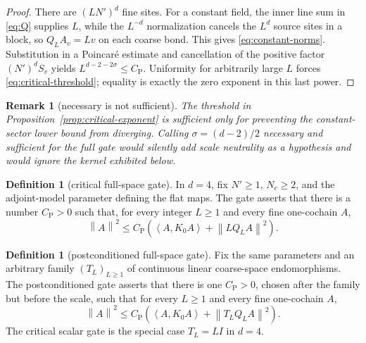 \documentclass[11pt]{article}
\newtheorem{remark}[theorem]{Remark}
\theoremstyle{definition}
\newtheorem{definition}[theorem]{Definition}
\newcommand{\CP}{C_{\mathrm P}}
\newcommand{\ip}[2]{\left\langle #1,#2\right\rangle}
\newcommand{\norm}[1]{\left\lVert #1\right\rVert}
\begin{document}
\begin{proof}
There are $(LN')^d$ fine sites.  For a constant field, the inner line sum in
\eqref{eq:Q} supplies $L$, while the $L^{-d}$ normalization cancels the $L^d$
source sites in a block, so $Q_LA_v=L v$ on each coarse bond.  This gives
\eqref{eq:constant-norms}.  Substitution in a Poincar\'e estimate and
cancellation of the positive factor $(N')^dS_v$ yields
$L^{d-2-2\sigma}\le\CP$.  Uniformity for arbitrarily large $L$ forces
\eqref{eq:critical-threshold}; equality is exactly the zero exponent in this
last power.
\end{proof}

\begin{remark}[necessary is not sufficient]\label{rem:not-sufficient}
The threshold in Proposition~\ref{prop:critical-exponent} is sufficient only
for preventing the \emph{constant-sector} lower bound from diverging.  Calling
$\sigma=(d-2)/2$ necessary and sufficient for the full gate would silently add
scale neutrality as a hypothesis and would ignore the kernel exhibited below.
\end{remark}

\begin{definition}[critical full-space gate]\label{def:gate}
In $d=4$, fix $N'\ge1$, $N_c\ge2$, and the adjoint-model parameter defining
the flat maps.  The gate asserts that there is a number $\CP>0$ such that, for
every integer $L\ge1$ and every fine one-cochain $A$,
\begin{equation}\label{eq:gate}
 \norm{A}^2\le\CP\left(\ip{A}{K_0A}+\norm{LQ_LA}^2\right).
\end{equation}
\end{definition}

\begin{definition}[postconditioned full-space gate]\label{def:postgate}
Fix the same parameters and an arbitrary family $(T_L)_{L\ge1}$ of continuous
linear coarse-space endomorphisms.  The postconditioned gate asserts that
there is one $\CP>0$, chosen after the family but before the scale, such that
for every $L\ge1$ and every fine one-cochain $A$,
\begin{equation}\label{eq:postgate}
 \norm{A}^2\le\CP\left(\ip{A}{K_0A}+\norm{T_LQ_LA}^2\right).
\end{equation}
The critical scalar gate is the special case $T_L=LI$ in $d=4$.
\end{definition}
\end{document}
